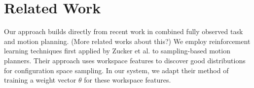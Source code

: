 \section{Related Work}
Our approach builds directly from recent work in combined fully observed
task and motion planning. (More related works about this?)
We employ reinforcement learning techniques first applied by Zucker et al.
to sampling-based motion planners. Their approach uses workspace features to
discover good distributions for configuration space sampling. In our system,
we adapt their method of training a weight vector $\theta$ for these workspace features.